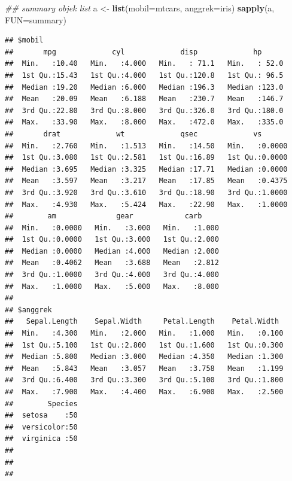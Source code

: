 \documentclass[]{book}
\newenvironment{Shaded}{\begin{snugshade}}{\end{snugshade}}
\newcommand{\CommentTok}[1]{\textcolor[rgb]{0.56,0.35,0.01}{\textit{#1}}}
\newcommand{\DataTypeTok}[1]{\textcolor[rgb]{0.13,0.29,0.53}{#1}}
\newcommand{\KeywordTok}[1]{\textcolor[rgb]{0.13,0.29,0.53}{\textbf{#1}}}
\newcommand{\NormalTok}[1]{#1}
\newcommand{\StringTok}[1]{\textcolor[rgb]{0.31,0.60,0.02}{#1}}
\theoremstyle{definition}
\theoremstyle{definition}
\theoremstyle{definition}
\theoremstyle{remark}
\begin{document}
\begin{Shaded}
\begin{Highlighting}[]
\CommentTok{## summary objek list}
\NormalTok{a <-}\StringTok{ }\KeywordTok{list}\NormalTok{(}\DataTypeTok{mobil=}\NormalTok{mtcars, }\DataTypeTok{anggrek=}\NormalTok{iris)}
\KeywordTok{sapply}\NormalTok{(a, }\DataTypeTok{FUN=}\NormalTok{summary)}
\end{Highlighting}
\end{Shaded}

\begin{verbatim}
## $mobil
##       mpg             cyl             disp             hp       
##  Min.   :10.40   Min.   :4.000   Min.   : 71.1   Min.   : 52.0  
##  1st Qu.:15.43   1st Qu.:4.000   1st Qu.:120.8   1st Qu.: 96.5  
##  Median :19.20   Median :6.000   Median :196.3   Median :123.0  
##  Mean   :20.09   Mean   :6.188   Mean   :230.7   Mean   :146.7  
##  3rd Qu.:22.80   3rd Qu.:8.000   3rd Qu.:326.0   3rd Qu.:180.0  
##  Max.   :33.90   Max.   :8.000   Max.   :472.0   Max.   :335.0  
##       drat             wt             qsec             vs        
##  Min.   :2.760   Min.   :1.513   Min.   :14.50   Min.   :0.0000  
##  1st Qu.:3.080   1st Qu.:2.581   1st Qu.:16.89   1st Qu.:0.0000  
##  Median :3.695   Median :3.325   Median :17.71   Median :0.0000  
##  Mean   :3.597   Mean   :3.217   Mean   :17.85   Mean   :0.4375  
##  3rd Qu.:3.920   3rd Qu.:3.610   3rd Qu.:18.90   3rd Qu.:1.0000  
##  Max.   :4.930   Max.   :5.424   Max.   :22.90   Max.   :1.0000  
##        am              gear            carb      
##  Min.   :0.0000   Min.   :3.000   Min.   :1.000  
##  1st Qu.:0.0000   1st Qu.:3.000   1st Qu.:2.000  
##  Median :0.0000   Median :4.000   Median :2.000  
##  Mean   :0.4062   Mean   :3.688   Mean   :2.812  
##  3rd Qu.:1.0000   3rd Qu.:4.000   3rd Qu.:4.000  
##  Max.   :1.0000   Max.   :5.000   Max.   :8.000  
## 
## $anggrek
##   Sepal.Length    Sepal.Width     Petal.Length    Petal.Width   
##  Min.   :4.300   Min.   :2.000   Min.   :1.000   Min.   :0.100  
##  1st Qu.:5.100   1st Qu.:2.800   1st Qu.:1.600   1st Qu.:0.300  
##  Median :5.800   Median :3.000   Median :4.350   Median :1.300  
##  Mean   :5.843   Mean   :3.057   Mean   :3.758   Mean   :1.199  
##  3rd Qu.:6.400   3rd Qu.:3.300   3rd Qu.:5.100   3rd Qu.:1.800  
##  Max.   :7.900   Max.   :4.400   Max.   :6.900   Max.   :2.500  
##        Species  
##  setosa    :50  
##  versicolor:50  
##  virginica :50  
##                 
##                 
## 
\end{verbatim}
\end{document}

